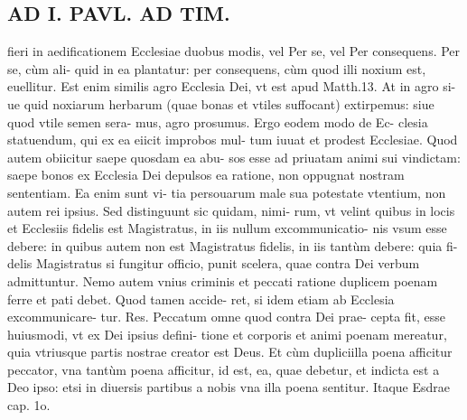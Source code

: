 \documentclass{article}
\begin{document}
\begin{pages}
\section*{AD I. PAVL. AD TIM. }
\marginpar{[ p.90 ]}\pstart fieri in aedificationem Ecclesiae duobus modis, vel Per se, vel Per consequens. Per se, cùm ali- quid in ea plantatur: per consequens, cùm quod illi noxium est, euellitur. Est enim similis agro Ecclesia Dei, vt est apud Matth.13. At in agro si- ue quid noxiarum herbarum (quae bonas et vtiles suffocant) extirpemus: siue quod vtile semen sera- mus, agro prosumus. Ergo eodem modo de Ec- clesia statuendum, qui ex ea eiicit improbos mul- tum iuuat et prodest Ecclesiae.  \pend\pstart Quod autem obiicitur saepe quosdam ea abu- sos esse ad priuatam animi sui vindictam: saepe bonos ex Ecclesia Dei depulsos ea ratione, non oppugnat nostram sententiam. Ea enim sunt vi- tia persouarum male sua potestate vtentium, non autem rei ipsius. Sed distinguunt sic quidam, nimi- rum, vt velint quibus in locis et Ecclesiis fidelis est Magistratus, in iis nullum excommunicatio- nis vsum esse debere: in quibus autem non est Magistratus fidelis, in iis tantùm debere: quia fi- delis Magistratus si fungitur officio, punit scelera, quae contra Dei verbum admittuntur. Nemo autem vnius criminis et peccati ratione duplicem poenam ferre et pati debet. Quod tamen accide- ret, si idem etiam ab Ecclesia excommunicare- tur. Res. Peccatum omne quod contra Dei prae- cepta fit, esse huiusmodi, vt ex Dei ipsius defini- tione et corporis et animi poenam mereatur, quia vtriusque partis nostrae creator est Deus. Et cùm dupliciilla poena afficitur peccator, vna tantùm poena afficitur, id est, ea, quae debetur, et indicta est a Deo ipso: etsi in diuersis partibus a nobis vna illa poena sentitur. Itaque Esdrae cap. 1o.  \pend

\end{pages}
\end{document}

